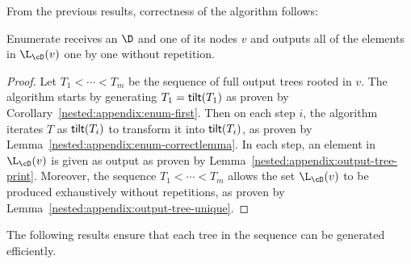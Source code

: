From the previous results, correctness of the algorithm follows:

\begin{claim}
	{\sc Enumerate} receives an \dsabbr $\D$ and one of its nodes $v$ and outputs all of the elements in $\L_{\cD}(v)$ one by one without repetition.
\end{claim}
\begin{proof}
	Let $T_1 <\cdots <T_m$ be the sequence of full output trees rooted in $v$. The algorithm starts by generating $T_1 = {\sf tilt}(T_1)$ as proven by Corollary~\ref{nested:appendix:enum-first}. Then on each step $i$, the algorithm iterates $T$ as ${\sf tilt}(T_i)$ to transform it into ${\sf tilt}(T_i)$, as proven by Lemma~\ref{nested:appendix:enum-correctlemma}. In each step, an element in $\L_{\cD}(v)$ is given as output as proven by Lemma~\ref{nested:appendix:output-tree-print}. Moreover, the sequence $T_1 <\cdots <T_m$ allows the set $\L_{\cD}(v)$ to be produced exhaustively without repetitions, as proven by Lemma~\ref{nested:appendix:output-tree-unique}.
\end{proof}

The following results ensure that each tree in the sequence can be generated efficiently.

